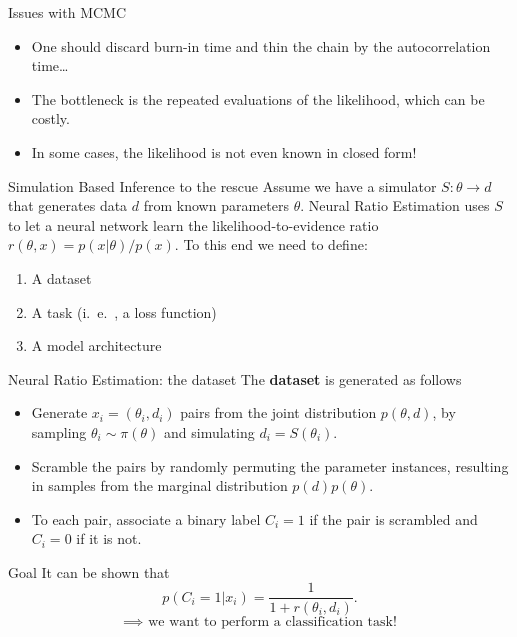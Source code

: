 \documentclass{beamer}
\begin{document}
\begin{frame}{Issues with MCMC}
    \begin{itemize}
        \item One should discard burn-in time and thin the chain by the autocorrelation time…
        \item The bottleneck is the repeated evaluations of the likelihood, which can be costly.
        \item In some cases, the likelihood is not even known in closed form!
    \end{itemize}
\begin{block}{Simulation Based Inference to the rescue}
    Assume we have a simulator $S:\theta \to d$ that generates data $d$ from known parameters $\theta$. 
    Neural Ratio Estimation uses $S$ to let a neural network learn the likelihood-to-evidence ratio $r(\theta, x) = p(x | \theta)/p(x)$.
    To this end we need to define:
    \begin{enumerate}
        \item A dataset
        \item A task (i.\ e.\ , a loss function)
        \item A model architecture
    \end{enumerate}
\end{block}
\end{frame}
\begin{frame}{Neural Ratio Estimation: the dataset}
    The \textbf{dataset} is generated as follows
        \begin{itemize}
            \item Generate $x_i = (\theta_i,d_i)$ pairs from the joint distribution $p(\theta, d)$, by sampling $\theta_i \sim \pi(\theta)$ and simulating $d_i = S(\theta_i)$.
            \item Scramble the pairs by randomly permuting the parameter instances, resulting in samples from the marginal distribution $p(d)p(\theta)$.
            \item To each pair, associate a binary label $C_i = 1$ if the pair is scrambled and $C_i = 0$ if it is not.
        \end{itemize}
    
    \begin{alertblock}{Goal}
        It can be shown that 
        \[p(C_i=1 | x_i) = \frac{1}{1+r(\theta_i, d_i)}.\]
        \[ \implies \text{ we want to perform a classification task!}\]
    \end{alertblock}
\end{frame}
\end{document}
